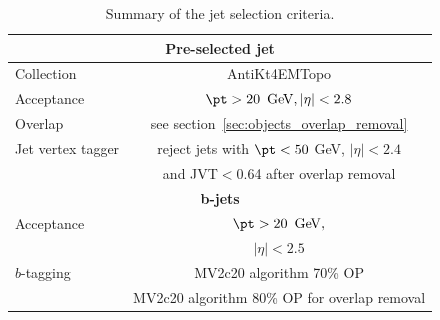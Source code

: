 \begin{table}[htb!]
\caption{Summary of the jet selection criteria. }
\label{tab:jetsdef}
\begin{center}
    \begin{tabular}{|l|c|}
      \hline
      \hline
      \multicolumn{2}{|c|}{\textbf{Pre-selected jet}}\\
    \hline
      \hline
      Collection     & AntiKt4EMTopo \\
      \hline
      Acceptance     & $\pt > 20\,\GeV, |\eta | < 2.8$ \\
      \hline
      Overlap        & see section~\ref{sec:objects_overlap_removal} \\ %
\hline
 Jet vertex tagger  &  reject jets with $\pt<50$ GeV, $|\eta|<2.4$ \\
                    &   and JVT$<$0.64 after overlap removal\\
      \hline\hline
      \multicolumn{2}{|c|}{\textbf{b-jets}}\\
    \hline
      \hline
     Acceptance     & $\pt > 20\,\GeV,$ \\
      & $|\eta | < 2.5$ \\ 
      \hline
   $b$-tagging  &  MV2c20 algorithm 70\% OP\\
                &  MV2c20 algorithm 80\% OP for overlap removal\\

      \hline   
\end{tabular}
\end{center}
\end{table}

